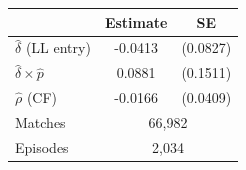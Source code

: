\begin{tabular}{lcc}
\toprule
 & Estimate & SE \\
\midrule
$\hat{\delta}$ (LL entry) & -0.0413 & (0.0827) \\
$\hat{\delta} \times \hat{p}$ & 0.0881 & (0.1511) \\
$\hat{\rho}$ (CF) & -0.0166 & (0.0409) \\
\midrule
Matches & \multicolumn{2}{c}{66,982} \\
Episodes & \multicolumn{2}{c}{2,034} \\
\bottomrule
\end{tabular}
